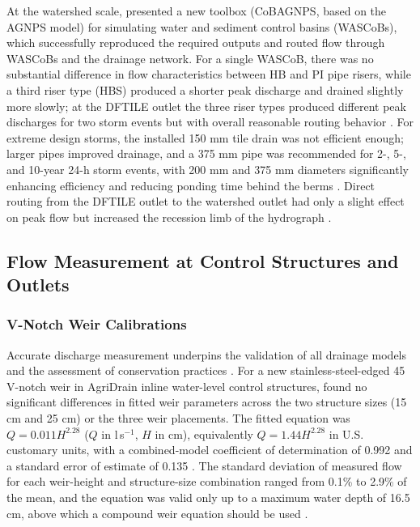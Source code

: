 At the watershed scale, \textcite{Gupta2019} presented a new toolbox (CoBAGNPS, based on
the AGNPS model) for simulating water and sediment control basins (WASCoBs), which
successfully reproduced the required outputs and routed flow through WASCoBs and the
drainage network. For a single WASCoB, there was no substantial difference in flow
characteristics between HB and PI pipe risers, while a third riser type (HBS) produced a
shorter peak discharge and drained slightly more slowly; at the DFTILE outlet the three
riser types produced different peak discharges for two storm events but with overall
reasonable routing behavior \parencite{Gupta2019}. For extreme design storms, the installed
150 mm tile drain was not efficient enough; larger pipes improved drainage, and a 375 mm
pipe was recommended for 2-, 5-, and 10-year 24-h storm events, with 200 mm and 375 mm
diameters significantly enhancing efficiency and reducing ponding time behind the berms
\parencite{Gupta2019}. Direct routing from the DFTILE outlet to the watershed outlet had
only a slight effect on peak flow but increased the recession limb of the hydrograph
\parencite{Gupta2019}.

\subsection{Flow Measurement at Control Structures and Outlets}

\subsubsection{V-Notch Weir Calibrations}

Accurate discharge measurement underpins the validation of all drainage models and the
assessment of conservation practices \parencite{Christianson2019,Katuwal2024}. For a new
stainless-steel-edged 45\textdegree{} V-notch weir in AgriDrain inline water-level control
structures, \textcite{Christianson2019} found no significant differences in fitted weir
parameters across the two structure sizes (15 cm and 25 cm) or the three weir placements.
The fitted equation was $Q = 0.011 H^{2.28}$ ($Q$ in l\,s$^{-1}$, $H$ in cm), equivalently
$Q = 1.44 H^{2.28}$ in U.S. customary units, with a combined-model coefficient of
determination of 0.992 and a standard error of estimate of 0.135
\parencite{Christianson2019}. The standard deviation of measured flow for each weir-height
and structure-size combination ranged from 0.1\% to 2.9\% of the mean, and the equation was
valid only up to a maximum water depth of 16.5 cm, above which a compound weir equation
should be used \parencite{Christianson2019}.

